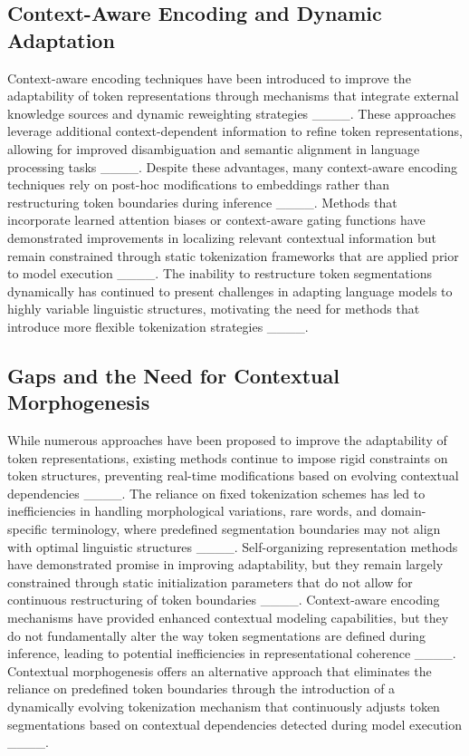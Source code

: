 \subsection{Context-Aware Encoding and Dynamic Adaptation}

Context-aware encoding techniques have been introduced to improve the adaptability of token representations through mechanisms that integrate external knowledge sources and dynamic reweighting strategies ____. These approaches leverage additional context-dependent information to refine token representations, allowing for improved disambiguation and semantic alignment in language processing tasks ____. Despite these advantages, many context-aware encoding techniques rely on post-hoc modifications to embeddings rather than restructuring token boundaries during inference ____. Methods that incorporate learned attention biases or context-aware gating functions have demonstrated improvements in localizing relevant contextual information but remain constrained through static tokenization frameworks that are applied prior to model execution ____. The inability to restructure token segmentations dynamically has continued to present challenges in adapting language models to highly variable linguistic structures, motivating the need for methods that introduce more flexible tokenization strategies ____.

\subsection{Gaps and the Need for Contextual Morphogenesis}

While numerous approaches have been proposed to improve the adaptability of token representations, existing methods continue to impose rigid constraints on token structures, preventing real-time modifications based on evolving contextual dependencies ____. The reliance on fixed tokenization schemes has led to inefficiencies in handling morphological variations, rare words, and domain-specific terminology, where predefined segmentation boundaries may not align with optimal linguistic structures ____. Self-organizing representation methods have demonstrated promise in improving adaptability, but they remain largely constrained through static initialization parameters that do not allow for continuous restructuring of token boundaries ____. Context-aware encoding mechanisms have provided enhanced contextual modeling capabilities, but they do not fundamentally alter the way token segmentations are defined during inference, leading to potential inefficiencies in representational coherence ____. Contextual morphogenesis offers an alternative approach that eliminates the reliance on predefined token boundaries through the introduction of a dynamically evolving tokenization mechanism that continuously adjusts token segmentations based on contextual dependencies detected during model execution ____.